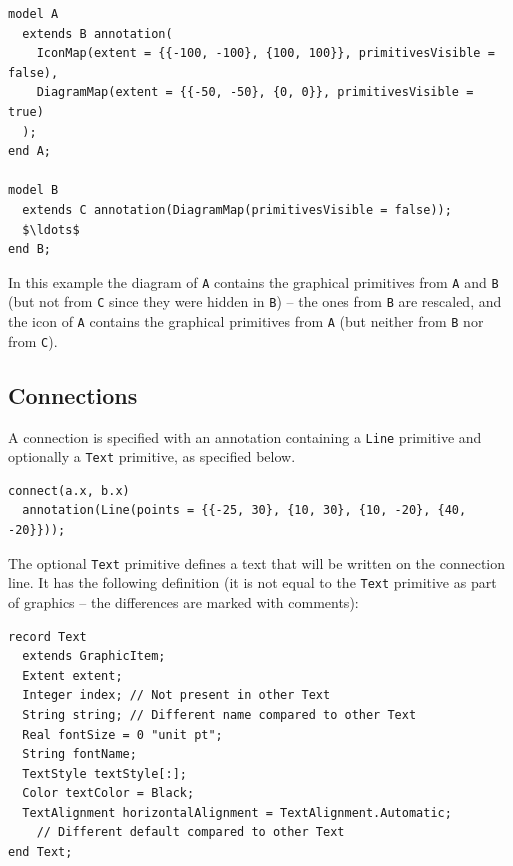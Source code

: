 \begin{example}
\begin{lstlisting}[language=modelica]
model A
  extends B annotation(
    IconMap(extent = {{-100, -100}, {100, 100}}, primitivesVisible = false),
    DiagramMap(extent = {{-50, -50}, {0, 0}}, primitivesVisible = true)
  );
end A;

model B
  extends C annotation(DiagramMap(primitivesVisible = false));
  $\ldots$
end B;
\end{lstlisting}
In this example the diagram of \lstinline!A! contains the graphical primitives from \lstinline!A! and \lstinline!B! (but not from \lstinline!C! since they were hidden in \lstinline!B!) -- the ones from \lstinline!B! are rescaled, and the icon of \lstinline!A! contains the graphical primitives from \lstinline!A! (but neither from \lstinline!B! nor from \lstinline!C!).
\end{example}

\subsection{Connections}\label{connections1}

A connection is specified with an annotation containing a \lstinline!Line! primitive and optionally a \lstinline!Text! primitive, as specified below.

\begin{example}
\begin{lstlisting}[language=modelica]
connect(a.x, b.x)
  annotation(Line(points = {{-25, 30}, {10, 30}, {10, -20}, {40, -20}}));
\end{lstlisting}
\end{example}

The optional \lstinline!Text! primitive defines a text that will be written on the connection line.
It has the following definition (it is not equal to the \lstinline!Text! primitive as part of graphics -- the differences are marked with comments):
\begin{lstlisting}[language=modelica]
record Text
  extends GraphicItem;
  Extent extent;
  Integer index; // Not present in other Text
  String string; // Different name compared to other Text
  Real fontSize = 0 "unit pt";
  String fontName;
  TextStyle textStyle[:];
  Color textColor = Black;
  TextAlignment horizontalAlignment = TextAlignment.Automatic;
    // Different default compared to other Text
end Text;
\end{lstlisting}

